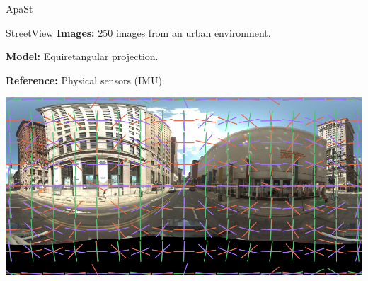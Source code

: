 \begin{frame}{ApaSt}
\end{frame}






\begin{frame}{StreetView}{}
  {\bf Images:} 250 images from an urban environment.

  {\bf Model:} Equiretangular projection.

  {\bf Reference:} Physical sensors (IMU).
  \centerline{\includegraphics[height=10\baselineskip]{equi.png}}
\end{frame}

